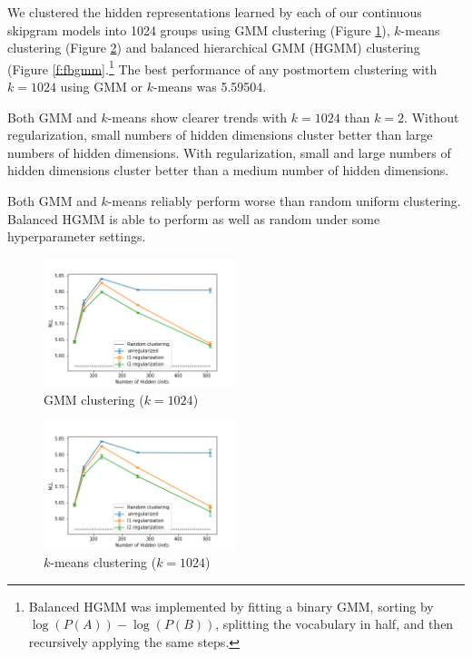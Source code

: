 \documentclass[11pt,letterpaper]{article}
\begin{document}
We clustered the hidden representations learned by each of our continuous skipgram models into 1024 groups using GMM clustering (Figure \ref{f:fgmm}), $k$-means clustering (Figure \ref{f:fkm}) and balanced hierarchical GMM (HGMM) clustering (Figure \ref{f:fbgmm}.\footnote{Balanced HGMM was implemented by fitting a binary GMM, sorting by $\log(P(A))-\log(P(B))$, splitting the vocabulary in half, and then recursively applying the same steps.} The best performance of any postmortem clustering with $k=1024$ using GMM or $k$-means was 5.59504.

Both GMM and $k$-means show clearer trends with $k=1024$ than $k=2$. Without regularization, small numbers of hidden dimensions cluster better than large numbers of hidden dimensions. With regularization, small and large numbers of hidden dimensions cluster better than a medium number of hidden dimensions.

Both GMM and $k$-means reliably perform worse than random uniform clustering. Balanced HGMM is able to perform as well as random under some hyperparameter settings.

\begin{figure}
  \caption{GMM clustering ($k=1024$)}
\label{f:fgmm}
  \centering
    \includegraphics[width=0.5\textwidth]{flat_gmm.png}
\end{figure}

\begin{figure}
  \caption{$k$-means clustering ($k=1024$)}
\label{f:fkm}
  \centering
    \includegraphics[width=0.5\textwidth]{flat_km.png}
\end{figure}
\end{document}
